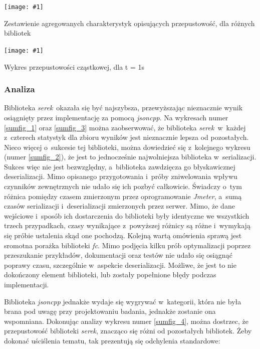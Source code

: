 \documentclass[12pt]{article}
\newcommand{\n}{\newline}
\newcommand{\putfig}[3]{
\begin{captioned}[H]
	\centering
	\texttt{[image: \#1]}
	\caption{#2}
	\label{#3}
	\medskip
\end{captioned}
}
\newcommand{\nonpl}[1]{{\it #1}}
\newcommand{\Jmeter}{\nonpl{Jmeter}\texttrademark}
\newcommand{\serek}{\nonpl{serek}}
\begin{document}
{{{				{
					\putfig{./charts/pre_generated_charts/throughput_summary_per_library_summary.png}{
						Zestawienie agregowanych charakterystyk opisujących przepustowość, dla różnych bibliotek
					}{sumfig_3}
				}

				{
					\putfig{./charts/output_with_charts_as_images/throughput_per_library.png}{ Wykres przepustowości cząstkowej, dla \Delta t  = 1s}{sumfig_4}
				}
			}

			{
				\subsubsection{Analiza}

				Biblioteka \serek\  okazała się być najszybsza, przewyższając nieznacznie wynik osiągnięty przez implementację za pomocą \nonpl{jsoncpp}. Na wykresach numer \ref{sumfig_1} oraz \ref{sumfig_3}
				można zaobserwować, że biblioteka \serek\ w~każdej z~czterech statystyk dla zbioru wyników jest nieznacznie lepsza od pozostałych. Nieco więcej o~sukcesie tej biblioteki,
				można dowiedzieć się z~kolejnego wykresu (numer \ref{sumfig_2}), że jest to jednocześnie najwolniejsza biblioteka w~serializacji.
				Sukces więc nie jest bezwzględny, a~biblioteka zawdzięcza go błyskawicznej deserializacji. Mimo opisanego przygotowania i~próby zniwelowania wpływu
				czynników zewnętrznych nie udało się ich pozbyć całkowicie. Świadczy o~tym różnica pomiędzy czasem zmierzonym przez oprogramowanie \Jmeter, a~sumą czasów
				serializacji i~deserializacji zmierzonych przez serwer. Mimo, że dane wejściowe i~sposób ich dostarczenia do biblioteki były identyczne
				we wszystkich trzech przypadkach, czasy wynikające z~powyższej różnicy są różne i~wymykają się próbie ustalenia skąd one pochodzą. Kolejną wartą omówienia sprawą
				jest sromotna porażka biblioteki \nonpl{fc}. Mimo podjęcia kilku prób optymalizacji poprzez przeszukanie przykładów, dokumentacji
				oraz testów nie udało się osiągnąć poprawy czasu, szczególnie w~aspekcie deserializacji. Możliwe, że jest to nie dokończony element biblioteki, lub zostały popełnione
				błędy podczas implementacji.\n

				Biblioteka \nonpl{jsoncpp} jednakże wydaje się wygrywać w~kategorii, która nie była brana pod uwagę przy projektowaniu badania, jednakże zostanie
				ona wspomniana. Dokonując analizy wykresu numer \ref{sumfig_4}, można dostrzec, że przepustowość biblioteki \serek, znacząco się różni od pozostałych bibliotek.
				Żeby dokonać uściślenia tematu, tak prezentują się odchylenia standardowe:

}}}
\end{document}
